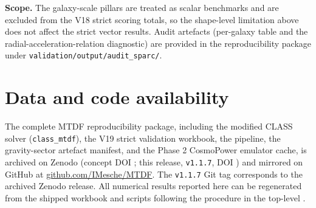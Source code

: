 \documentclass[11pt,a4paper]{article}
\begin{document}
\textbf{Scope.} The galaxy-scale pillars are treated as scalar benchmarks and are excluded from the V18 strict scoring totals, so the shape-level limitation above does not affect the strict vector results. Audit artefacts (per-galaxy table and the radial-acceleration-relation diagnostic) are provided in the reproducibility package under \texttt{validation/\allowbreak{}output/\allowbreak{}audit\_\allowbreak{}sparc/\allowbreak{}}.

\section{Data and code availability}
The complete MTDF reproducibility package, including the modified CLASS solver
(\texttt{class\_\allowbreak{}mtdf}), the V19 strict validation workbook, the
\texttt{{\small\protect{}}} pipeline, the gravity-sector artefact manifest,
and the Phase 2 CosmoPower emulator cache, is archived on Zenodo
(concept DOI \href{https://doi.org/10.5281/zenodo.19741058}{{\small\protect{}}};
this release, \texttt{v1.1.7}, DOI
\href{https://doi.org/10.5281/zenodo.21525855}{{\small\protect{}}})
and mirrored on GitHub at
\href{https://github.com/IMesche/MTDF}{github.com/\allowbreak{}IMesche/\allowbreak{}MTDF}.
The \texttt{v1.1.7} Git tag corresponds to the archived Zenodo release. All
numerical results reported here can be regenerated from the shipped workbook
and scripts following the procedure in the top-level \texttt{{\small\protect{}}}.
\end{document}
